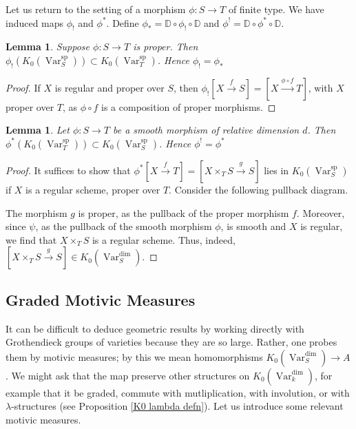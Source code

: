 \documentclass{amsart}
\newtheorem{lem}[thm]{Lemma}
\theoremstyle{definition}
\DeclareMathOperator{\Var}{Var}
\DeclareMathOperator{\spr}{sp}
\newcommand{\Kdim}{K_0(\Var_k^{\dim})}
\newcommand{\KdimS}{K_0(\Var_S^{\dim})}
\newcommand{\KsprS}{K_0(\Var_S^{\spr})}
\numberwithin{equation}{section}
\begin{document}
Let us return to the setting of a morphism $\phi: S \rightarrow T$ of finite type. We have induced maps $\phi_!$ and $\phi^*$. Define $\phi_* = \mathbb{D} \circ \phi_! \circ \mathbb{D}$ and $\phi^! = \mathbb{D} \circ \phi^* \circ \mathbb{D}$.



\begin{lem}\label{proper}
Suppose $\phi:S \rightarrow T$ is proper. Then $\phi_!(\KsprS) \subset K_0(\Var_T^{\spr})$. Hence $\phi_! = \phi_*$
\end{lem}

\begin{proof}
If $X$ is regular and proper over $S$, then $\phi_![X \xrightarrow[]{f} S] = [X \xrightarrow[]{\phi \circ f} T]$, with $X$ proper over $T$, as $\phi \circ f$ is a composition of proper morphisms.
\end{proof}


\begin{lem}\label{smooth}
Let $\phi:S \rightarrow T$ be a smooth morphism of relative dimension $d$. Then $\phi^*(K_0(\Var_T^{\spr})) \subset \KsprS$. Hence $\phi^! = \phi^*$
\end{lem}

\begin{proof}
It suffices to show that $\phi^*[X \xrightarrow[]{f} T] = [X \times_T S \xrightarrow[]{g} S]$ lies in $\KsprS$ if $X$ is a regular scheme, proper over $T$. Consider the following pullback diagram.
\centerline{
}
The morphism $g$ is proper, as the pullback of the proper morphism $f$. Moreover, since $\psi$, as the pullback of the smooth morphism $\phi$, is smooth and $X$ is regular, we find that $X \times_T S$ is a regular scheme. Thus, indeed, $[X \times_T S \xrightarrow[]{g} S] \in \KdimS$.
\end{proof}




\subsection{Graded Motivic Measures}\label{motivic measures}
It can be difficult to deduce geometric results by working directly with Grothendieck groups of varieties because they are so large. Rather, one probes them by motivic measures; by this we mean homomorphisms $K_0(\Var_S^{\dim}) \rightarrow A$. We might ask that the map preserve other structures on $\Kdim$, for example that it be graded, commute with mutliplication, with involution, or with $\lambda$-structures (see Proposition \ref{K0 lambda defn}). Let us introduce some relevant motivic measures.
\end{document}
